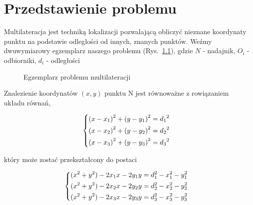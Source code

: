 \chapter{Przedstawienie problemu}

Multilateracja jest techniką lokalizacji pozwalającą obliczyć nieznane koordynaty punktu na podstawie odległości od innych, znanych punktów. Weźmy dwuwymiarowy egzemplarz naszego problemu (Rys.~\ref{fig:example}), gdzie $N$ - nadajnik, $O_i$ - odbiorniki, $d_i$ - odległości

\begin{figure}[!h]
    \centering
    \caption[short]{Egzemplarz problemu multilateracji}
\label{fig:example}
\end{figure}

Znalezienie koordynatów $(x,y)$ punktu N jest równoważne z rowiązaniem układu równań,

\begin{equation}
    \begin{dcases}
        {(x - x_1)}^2 + {(y - y_1)}^2 = {d_1}^2\\
        {(x - x_2)}^2 + {(y - y_2)}^2 = {d_2}^2\\
        {(x - x_3)}^2 + {(y - y_3)}^2 = {d_3}^2\\
    \end{dcases}
\end{equation}

który może zostać przekształcony do postaci

\begin{equation}
    \begin{dcases}
        (x^2 + y^2) - 2x_1x - 2y_1y = d_1^2 - x_1^2 - y_1^2\\
        (x^2 + y^2) - 2x_2x - 2y_2y = d_2^2 - x_2^2 - y_2^2\\
        (x^2 + y^2) - 2x_3x - 2y_3y = d_3^2 - x_3^2 - y_3^2\\
    \end{dcases}
\end{equation}

